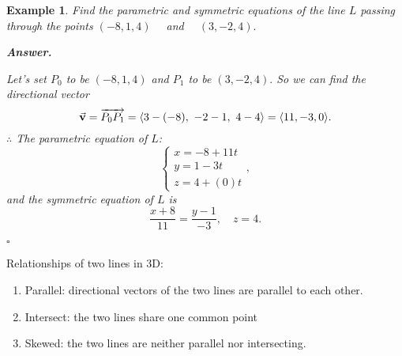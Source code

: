 \documentclass[12pt,a4paper]{article}
\newtheorem{eg}{Example}[subsection]
\newenvironment*{ans}{\par\indent\textbf{\textit{Answer. }}\par}{\par\hfill{$\square$}\par}
\def\vecv{\va{v}}
\begin{document}
\begin{eg}
	Find the parametric and symmetric equations of the line $L$ passing through the points $(-8,1,4)\quad$ and $\quad (3,-2,4).$
	\begin{ans}
		Let's set $P_0$ to be $(-8,1,4)$ and $P_1$ to be $(3,-2,4).$ So we can find the directional vector \[\vecv=\overrightarrow{P_0P_1}=\langle3-(-8),\ -2-1,\ 4-4\rangle=\langle11,-3,0\rangle.\]
		$\therefore$ The parametric equation of $L$: \[\begin{cases}x=-8+11t\\y=1-3t\\z=4+(0)t\end{cases}, \]
		and the symmetric equation of $L$ is \[\frac{x+8}{11}=\frac{y-1}{-3},\quad z=4.\]
	\end{ans}
\end{eg}
Relationships of two lines in 3D: 
\begin{enumerate}
	\item Parallel: directional vectors of the two lines are parallel to each other.
	\item Intersect: the two lines share one common point
	\item Skewed: the two lines are neither parallel nor intersecting. 
\end{enumerate}
\end{document}
